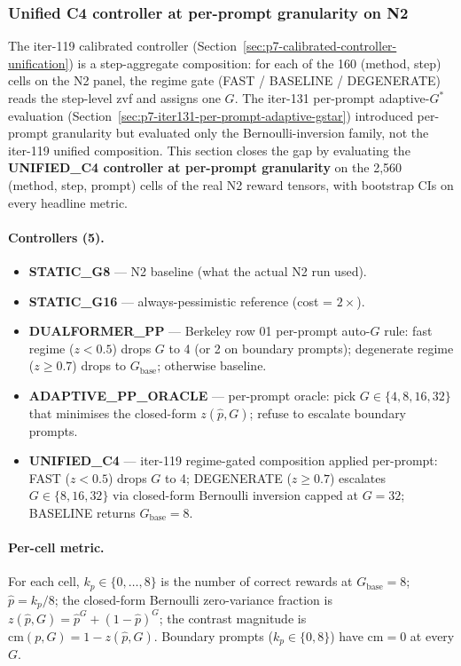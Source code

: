 \documentclass{article}
\begin{document}
\subsubsection{Unified C4 controller at per-prompt granularity on N2}
\label{sec:p7-iter147-unified-per-prompt}

The iter-119 calibrated controller (Section~\ref{sec:p7-calibrated-controller-unification})
is a step-aggregate composition: for each of the 160 (method, step) cells on the N2 panel,
the regime gate (FAST / BASELINE / DEGENERATE) reads the step-level zvf and assigns one $G$.
The iter-131 per-prompt adaptive-$G^*$ evaluation (Section~\ref{sec:p7-iter131-per-prompt-adaptive-gstar})
introduced per-prompt granularity but evaluated only the Bernoulli-inversion family, not the
iter-119 unified composition. This section closes the gap by evaluating the
\textbf{UNIFIED\_C4 controller at per-prompt granularity} on the 2,560
(method, step, prompt) cells of the real N2 reward tensors, with bootstrap
CIs on every headline metric.

\paragraph{Controllers (5).}

\begin{itemize}
\item \textbf{STATIC\_G8} --- N2 baseline (what the actual N2 run used).
\item \textbf{STATIC\_G16} --- always-pessimistic reference (cost = $2\times$).
\item \textbf{DUALFORMER\_PP} --- Berkeley row 01 per-prompt auto-$G$ rule:
      fast regime ($z<0.5$) drops $G$ to 4 (or 2 on boundary prompts);
      degenerate regime ($z\geq 0.7$) drops to $G_{\mathrm{base}}$; otherwise baseline.
\item \textbf{ADAPTIVE\_PP\_ORACLE} --- per-prompt oracle: pick $G \in \{4,8,16,32\}$
      that minimises the closed-form $z(\hat p, G)$; refuse to escalate boundary prompts.
\item \textbf{UNIFIED\_C4} --- iter-119 regime-gated composition applied per-prompt:
      FAST ($z<0.5$) drops $G$ to 4; DEGENERATE ($z\geq 0.7$) escalates
      $G \in \{8, 16, 32\}$ via closed-form Bernoulli inversion capped at $G=32$;
      BASELINE returns $G_{\mathrm{base}}=8$.
\end{itemize}

\paragraph{Per-cell metric.} For each cell, $k_p \in \{0,\ldots,8\}$ is the
number of correct rewards at $G_{\mathrm{base}}{=}8$; $\hat p = k_p/8$; the
closed-form Bernoulli zero-variance fraction is $z(\hat p, G) = \hat p^G +
(1-\hat p)^G$; the contrast magnitude is $\mathrm{cm}(p, G) = 1 - z(\hat p, G)$.
Boundary prompts ($k_p \in \{0, 8\}$) have $\mathrm{cm} = 0$ at every $G$.
\end{document}
